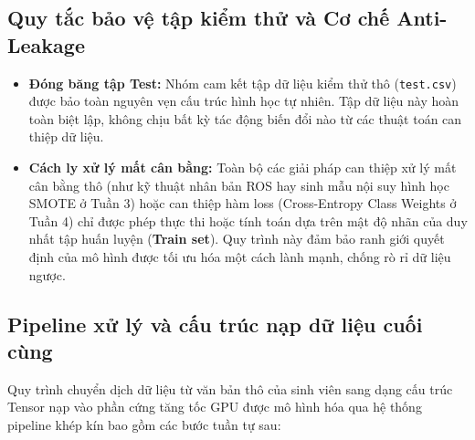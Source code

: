 \documentclass[conference,10pt,a4paper]{IEEEtran}
\begin{document}
\subsection{Quy tắc bảo vệ tập kiểm thử và Cơ chế Anti-Leakage}
\begin{itemize}
    \item \textbf{Đóng băng tập Test:} Nhóm cam kết tập dữ liệu kiểm thử thô (\texttt{test.csv}) được bảo toàn nguyên vẹn cấu trúc hình học tự nhiên. Tập dữ liệu này hoàn toàn biệt lập, không chịu bất kỳ tác động biến đổi nào từ các thuật toán can thiệp dữ liệu.
    \item \textbf{Cách ly xử lý mất cân bằng:} Toàn bộ các giải pháp can thiệp xử lý mất cân bằng thô (như kỹ thuật nhân bản ROS hay sinh mẫu nội suy hình học SMOTE ở Tuần 3) hoặc can thiệp hàm loss (Cross-Entropy Class Weights ở Tuần 4) chỉ được phép thực thi hoặc tính toán dựa trên mật độ nhãn của duy nhất tập huấn luyện (\textbf{Train set}). Quy trình này đảm bảo ranh giới quyết định của mô hình được tối ưu hóa một cách lành mạnh, chống rò rỉ dữ liệu ngược.
\end{itemize}

\subsection{Pipeline xử lý và cấu trúc nạp dữ liệu cuối cùng}
Quy trình chuyển dịch dữ liệu từ văn bản thô của sinh viên sang dạng cấu trúc Tensor nạp vào phần cứng tăng tốc GPU được mô hình hóa qua hệ thống pipeline khép kín bao gồm các bước tuần tự sau:
\end{document}
